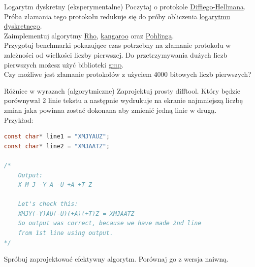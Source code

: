 \begin{exercise}{Logarytm dyskretny (eksperymentalne)}{}
Poczytaj o protokole \href{https://en.wikipedia.org/wiki/Diffie\%E2\%80\%93Hellman_key_exchange}{Diffiego-Hellmana}.
Próba złamania tego protokołu redukuje się do próby obliczenia \href{https://en.wikipedia.org/wiki/Discrete_logarithm}{logarytmu dyskretnego}. \\

Zaimplementuj algorytmy \href{https://en.wikipedia.org/wiki/Pollard\%27s_rho_algorithm}{Rho}, \href{https://en.wikipedia.org/wiki/Pollard\%27s_kangaroo_algorithm}{kangaroo} oraz \href{https://en.wikipedia.org/wiki/Pohlig\%E2\%80\%93Hellman_algorithm}{Pohlinga}. \\

Przygotuj benchmarki pokazujące czas potrzebny na złamanie protokołu w zależności od wielkości liczby pierwszej. Do przetrzymywania dużych liczb pierwszych możesz użyć biblioteki \href{https://gmplib.org/}{gmp}. \\

Czy możliwe jest złamanie protokołów z użyciem 4000 bitowych liczb pierwszych?
\end{exercise}

\begin{exercise}{Różnice w wyrazach (algorytmiczne)}{}
Zaprojektuj prosty difftool. Który będzie porównywał 2 linie tekstu a następnie wydrukuje na ekranie najmniejszą liczbę zmian jaka powinna zostać dokonana aby zmienić jedną linie w drugą. \\
Przykład:
\begin{lstlisting}[language=C,style=C99]
const char* line1 = "XMJYAUZ";
const char* line2 = "XMJAATZ";

/*  
    Output:
    X M J -Y A -U +A +T Z

    Let's check this:
    XMJY(-Y)AU(-U)(+A)(+T)Z = XMJAATZ
    So output was correct, because we have made 2nd line
    from 1st line using output.
*/
\end{lstlisting}

Spróbuj zaprojektować efektywny algorytm. Porównaj go z wersja naiwną.
\end{exercise}


